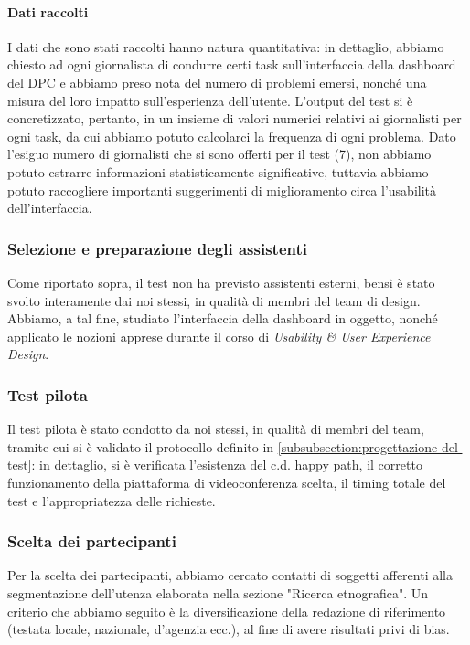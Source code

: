 \paragraph{Dati raccolti}
I dati che sono stati raccolti hanno natura quantitativa: in dettaglio, abbiamo chiesto ad ogni giornalista di condurre certi task sull'interfaccia della dashboard del DPC e abbiamo preso nota del numero di problemi emersi, nonché una misura del loro impatto sull'esperienza dell'utente. L'output del test si è concretizzato, pertanto, in un insieme di valori numerici relativi ai giornalisti per ogni task, da cui abbiamo potuto calcolarci la frequenza di ogni problema.
Dato l'esiguo numero di giornalisti che si sono offerti per il test (7), non abbiamo potuto estrarre informazioni statisticamente significative, tuttavia abbiamo potuto raccogliere importanti suggerimenti di miglioramento circa l'usabilità dell'interfaccia.

\subsubsection{Selezione e preparazione degli assistenti}
Come riportato sopra, il test non ha previsto assistenti esterni, bensì è stato svolto interamente dai noi stessi, in qualità di membri del team di design. Abbiamo, a tal fine, studiato l'interfaccia della dashboard in oggetto, nonché applicato le nozioni apprese durante il corso di \textit{Usability \& User Experience Design}.

\subsubsection{Test pilota}
Il test pilota è stato condotto da noi stessi, in qualità di membri del team, tramite cui si è validato il protocollo definito in \ref{subsubsection:progettazione-del-test}: in dettaglio, si è verificata l'esistenza del c.d. happy path, il corretto funzionamento della piattaforma di videoconferenza scelta, il timing totale del test e l'appropriatezza delle richieste.

\subsubsection{Scelta dei partecipanti}
Per la scelta dei partecipanti, abbiamo cercato contatti di soggetti afferenti alla segmentazione dell'utenza elaborata nella sezione "Ricerca etnografica". Un criterio che abbiamo seguito è la diversificazione della redazione di riferimento (testata locale, nazionale, d'agenzia ecc.), al fine di avere risultati privi di bias.

